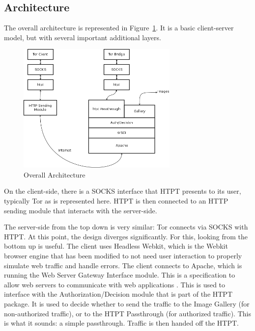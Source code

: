 \subsection{Architecture}
The overall architecture is represented in Figure~\ref{fig:overall_arch}. It is a basic client-server model, but with several important additional layers.

\begin{figure}[t]
\centering
\includegraphics[width=0.7\textwidth]{Overall_architecture}
\caption{Overall Architecture}
\label{fig:overall_arch}
\end{figure}

On the client-side, there is a SOCKS interface that HTPT presents to its user, typically Tor as is represented here. HTPT is then connected to an HTTP sending module that interacts with the server-side.

The server-side from the top down is very similar: Tor connects via SOCKS with HTPT. At this point, the design diverges significantly. For this, looking from the bottom up is useful. 
The client uses Headless Webkit, which is the Webkit browser engine that has been modified to not need user interaction to properly simulate web traffic and handle errors.
The client connects to Apache, which is running the Web Server Gateway Interface module. This is a specification to allow web servers to communicate with web applications \cite{Ref16}. This is used to interface with the Authorization/Decision module that is part of the HTPT package. It is used to decide whether to send the traffic to the Image Gallery (for non-authorized traffic), or to the HTPT Passthrough (for authorized traffic). This is what it sounds: a simple passthrough. Traffic is then handed off the HTPT. 


